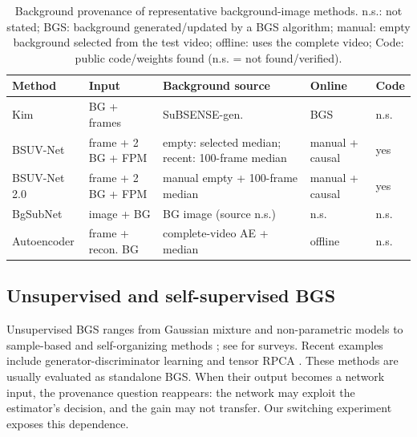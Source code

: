 \documentclass[sn-mathphys-num,iicol]{sn-jnl}
\begin{document}
\begin{table}[t]
\centering
\scriptsize
\setlength{\tabcolsep}{3pt}
\caption{Background provenance of representative background-image methods.
n.s.: not stated; BGS: background generated/updated by a BGS algorithm; manual:
empty background selected from the test video; offline: uses the complete
video; Code: public code/weights found (n.s. = not found/verified).}
\label{tab:litprov}
\begin{tabular}{@{}>{\raggedright\arraybackslash}p{24mm}>{\raggedright\arraybackslash}p{28mm}>{\raggedright\arraybackslash}p{57mm}>{\raggedright\arraybackslash}p{13mm}>{\raggedright\arraybackslash}p{8mm}@{}}
\toprule
Method & Input & Background source & Online & Code \\
\midrule
Kim \cite{kimbgsub2020} & BG + frames & SuBSENSE-gen. & BGS & n.s. \\
BSUV-Net \cite{bsuvnet2020} & frame + 2 BG + FPM & empty: selected median; recent: 100-frame median & manual + causal & yes \\
BSUV-Net 2.0 \cite{bsuvnet2021} & frame + 2 BG + FPM & manual empty + 100-frame median & manual + causal & yes \\
BgSubNet \cite{bgsubnet2024} & image + BG & BG image (source n.s.) & n.s. & n.s. \\
Autoencoder \cite{autonoise2023} & frame + recon. BG & complete-video AE + median & offline & n.s. \\
\bottomrule
\end{tabular}
\end{table}

\subsection{Unsupervised and self-supervised BGS}
Unsupervised BGS ranges from Gaussian mixture and non-parametric models
\cite{stauffer1999,elgammal2000,gmmreview2017} to sample-based and self-organizing
methods \cite{vibe2011,sobs2008,pbas2012,subsense2015}; see
\cite{bouwmans2014,garcia2020,sobral2014} for surveys. Recent examples include
generator-discriminator learning \cite{ganbgs2025} and tensor RPCA
\cite{sttrpca2025}. These methods are usually evaluated as standalone BGS. When
their output becomes a network input, the provenance question reappears: the
network may exploit the estimator's decision, and the gain may not transfer. Our
switching experiment exposes this dependence.
\end{document}
